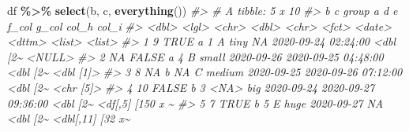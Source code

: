 \documentclass[
]{report}
\newenvironment{Shaded}{\begin{snugshade}}{\end{snugshade}}
\newcommand{\CommentTok}[1]{\textcolor[rgb]{0.56,0.35,0.01}{\textit{#1}}}
\newcommand{\KeywordTok}[1]{\textcolor[rgb]{0.13,0.29,0.53}{\textbf{#1}}}
\newcommand{\NormalTok}[1]{#1}
\newcommand{\OperatorTok}[1]{\textcolor[rgb]{0.81,0.36,0.00}{\textbf{#1}}}
\newcommand{\StringTok}[1]{\textcolor[rgb]{0.31,0.60,0.02}{#1}}
\begin{document}
\begin{Shaded}
\begin{Highlighting}[]
\NormalTok{df }\OperatorTok{\%\textgreater{}\%}
\StringTok{  }\KeywordTok{select}\NormalTok{(b, c, }\KeywordTok{everything}\NormalTok{())}
\CommentTok{\#\textgreater{} \# A tibble: 5 x 10}
\CommentTok{\#\textgreater{}       b c     group     a d     e      f\_col      g\_col               col\_h    col\_i           }
\CommentTok{\#\textgreater{}   \textless{}dbl\textgreater{} \textless{}lgl\textgreater{} \textless{}chr\textgreater{} \textless{}dbl\textgreater{} \textless{}chr\textgreater{} \textless{}fct\textgreater{}  \textless{}date\textgreater{}     \textless{}dttm\textgreater{}              \textless{}list\textgreater{}   \textless{}list\textgreater{}          }
\CommentTok{\#\textgreater{} 1     9 TRUE  a         1 A     tiny   NA         2020{-}09{-}24 02:24:00 \textless{}dbl [2\textasciitilde{} \textless{}NULL\textgreater{}          }
\CommentTok{\#\textgreater{} 2    NA FALSE a         4 B     small  2020{-}09{-}26 2020{-}09{-}25 04:48:00 \textless{}dbl [2\textasciitilde{} \textless{}dbl [1]\textgreater{}       }
\CommentTok{\#\textgreater{} 3     8 NA    b        NA C     medium 2020{-}09{-}25 2020{-}09{-}26 07:12:00 \textless{}dbl [2\textasciitilde{} \textless{}chr [5]\textgreater{}       }
\CommentTok{\#\textgreater{} 4    10 FALSE b         3 \textless{}NA\textgreater{}  big    2020{-}09{-}24 2020{-}09{-}27 09:36:00 \textless{}dbl [2\textasciitilde{} \textless{}df[,5] [150 x \textasciitilde{}}
\CommentTok{\#\textgreater{} 5     7 TRUE  b         5 E     huge   2020{-}09{-}27 NA                  \textless{}dbl [2\textasciitilde{} \textless{}dbl[,11] [32 x\textasciitilde{}}
\end{Highlighting}
\end{Shaded}
\end{document}
